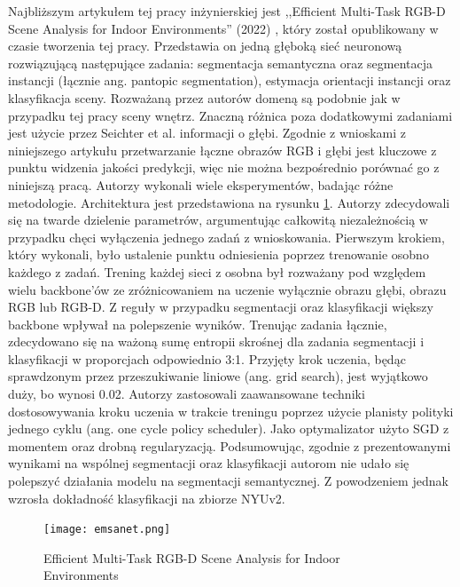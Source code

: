 Najbliższym artykułem tej pracy inżynierskiej jest ,,Efficient Multi-Task RGB-D Scene Analysis for Indoor Environments'' (2022) \cite{9892852}, który został opublikowany w czasie tworzenia tej pracy. Przedstawia on jedną głęboką sieć neuronową rozwiązującą następujące zadania: segmentacja semantyczna oraz segmentacja instancji (łącznie ang. pantopic segmentation), estymacja orientacji instancji oraz klasyfikacja sceny. Rozważaną przez autorów domeną są podobnie jak w przypadku tej pracy sceny wnętrz. Znaczną różnica poza dodatkowymi zadaniami jest użycie przez Seichter et al. informacji o głębi. Zgodnie z wnioskami z niniejszego artykułu przetwarzanie łączne obrazów RGB i głębi jest kluczowe z punktu widzenia jakości predykcji, więc nie można bezpośrednio porównać go z niniejszą pracą. Autorzy wykonali wiele eksperymentów, badając różne metodologie. Architektura jest przedstawiona na rysunku \ref{fig:emsanet}. Autorzy zdecydowali się na twarde dzielenie parametrów, argumentując całkowitą niezależnością w przypadku chęci wyłączenia jednego zadań z wnioskowania. Pierwszym krokiem, który wykonali, było ustalenie punktu odniesienia poprzez trenowanie osobno każdego z zadań. Trening każdej sieci z osobna był rozważany pod względem wielu backbone'ów ze zróżnicowaniem na uczenie wyłącznie obrazu głębi, obrazu RGB lub RGB-D. Z reguły w przypadku segmentacji oraz klasyfikacji większy backbone wpływał na polepszenie wyników. Trenując zadania łącznie, zdecydowano się na ważoną sumę entropii skrośnej dla zadania segmentacji i klasyfikacji w proporcjach odpowiednio 3:1. Przyjęty krok uczenia, będąc sprawdzonym przez przeszukiwanie liniowe (ang. grid search), jest wyjątkowo duży, bo wynosi 0.02. Autorzy zastosowali zaawansowane techniki dostosowywania kroku uczenia w trakcie treningu poprzez użycie planisty polityki jednego cyklu (ang. one cycle policy scheduler). Jako optymalizator użyto SGD z momentem oraz drobną regularyzacją. Podsumowując, zgodnie z prezentowanymi wynikami na wspólnej segmentacji oraz klasyfikacji autorom nie udało się polepszyć działania modelu na segmentacji semantycznej. Z powodzeniem jednak wzrosła dokładność klasyfikacji na zbiorze NYUv2.

\begin{figure}[ht!]
    \centering
    \texttt{[image: emsanet.png]}
    \caption{Efficient Multi-Task RGB-D Scene Analysis for Indoor Environments \cite{9892852}}
    \label{fig:emsanet}
\end{figure}


